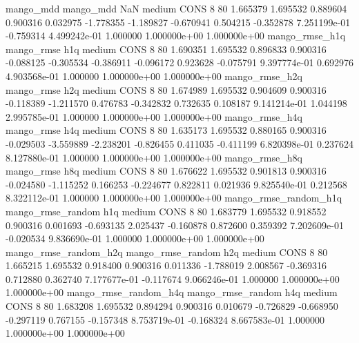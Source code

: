             mango_mdd         mango_mdd                  NaN     medium     CONS                 8 80  1.665379       1.695532 0.889604       0.900316    0.032975     -1.778355     -1.189827    -0.670941       0.504215 -0.352878 7.251199e-01    -0.759314   4.499242e-01            1.000000    1.000000e+00        1.000000e+00
       mango_rmse_h1q        mango_rmse                  h1q     medium     CONS                 8 80  1.690351       1.695532 0.896833       0.900316   -0.088125     -0.305534     -0.386911    -0.096172       0.923628 -0.075791 9.397774e-01     0.692976   4.903568e-01            1.000000    1.000000e+00        1.000000e+00
       mango_rmse_h2q        mango_rmse                  h2q     medium     CONS                 8 80  1.674989       1.695532 0.904609       0.900316   -0.118389     -1.211570      0.476783    -0.342832       0.732635  0.108187 9.141214e-01     1.044198   2.995785e-01            1.000000    1.000000e+00        1.000000e+00
       mango_rmse_h4q        mango_rmse                  h4q     medium     CONS                 8 80  1.635173       1.695532 0.880165       0.900316   -0.029503     -3.559889     -2.238201    -0.826455       0.411035 -0.411199 6.820398e-01     0.237624   8.127880e-01            1.000000    1.000000e+00        1.000000e+00
       mango_rmse_h8q        mango_rmse                  h8q     medium     CONS                 8 80  1.676622       1.695532 0.901813       0.900316   -0.024580     -1.115252      0.166253    -0.224677       0.822811  0.021936 9.825540e-01     0.212568   8.322112e-01            1.000000    1.000000e+00        1.000000e+00
mango_rmse_random_h1q mango_rmse_random                  h1q     medium     CONS                 8 80  1.683779       1.695532 0.918552       0.900316    0.001693     -0.693135      2.025437    -0.160878       0.872600  0.359392 7.202609e-01    -0.020534   9.836690e-01            1.000000    1.000000e+00        1.000000e+00
mango_rmse_random_h2q mango_rmse_random                  h2q     medium     CONS                 8 80  1.665215       1.695532 0.918400       0.900316    0.011336     -1.788019      2.008567    -0.369316       0.712880  0.362740 7.177677e-01    -0.117674   9.066246e-01            1.000000    1.000000e+00        1.000000e+00
mango_rmse_random_h4q mango_rmse_random                  h4q     medium     CONS                 8 80  1.683208       1.695532 0.894294       0.900316    0.010679     -0.726829     -0.668950    -0.297119       0.767155 -0.157348 8.753719e-01    -0.168324   8.667583e-01            1.000000    1.000000e+00        1.000000e+00
